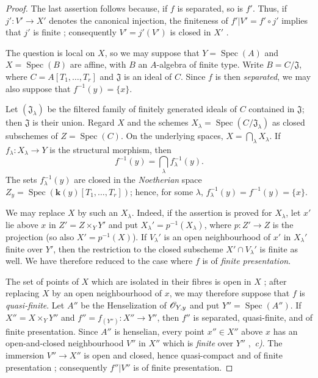 \begin{proof}
The last assertion follows because, if $f$ is separated, so is $f'$. Thus, if $j':V'\to X'$ denotes the canonical injection, the finiteness of $f'|V'=f'\circ j'$ implies that $j'$ is finite ; consequently $V'=j'(V')$ is closed in $X'$ .

The question is local on $X$, so we may suppose that $Y=\operatorname{Spec}(A)$ and $X=\operatorname{Spec}(B)$ are affine, with $B$ an $A$-algebra of finite type. Write $B=C/\mathfrak{J}$, where $C=A[T_1,\ldots,T_r]$ and $\mathfrak{J}$ is an ideal of $C$. Since $f$ is then \emph{separated}, we may also suppose that $f^{-1}(y)=\{x\}$.

Let $(\mathfrak{J}_\lambda)$ be the filtered family of finitely generated ideals of $C$ contained in $\mathfrak{J}$; then $\mathfrak{J}$ is their union. Regard $X$ and the schemes $X_\lambda=\operatorname{Spec}(C/\mathfrak{J}_\lambda)$ as closed subschemes of $Z=\operatorname{Spec}(C)$. On the underlying spaces, $X=\bigcap_\lambda X_\lambda$. If $f_\lambda:X_\lambda\to Y$ is the structural morphism, then
\[
  f^{-1}(y)=\bigcap_\lambda f_\lambda^{-1}(y).
\]
The sets $f_\lambda^{-1}(y)$ are closed in the \emph{Noetherian} space $Z_y=\operatorname{Spec}(\boldsymbol{k}(y)[T_1,\ldots,T_r])$; hence, for some $\lambda$, $f_\lambda^{-1}(y)=f^{-1}(y)=\{x\}$.

We may replace $X$ by such an $X_\lambda$. Indeed, if the assertion is proved for $X_\lambda$, let $x'$ lie above $x$ in $Z'=Z\times_{Y}Y'$ and put $X_\lambda'=p^{-1}(X_\lambda)$, where $p:Z'\to Z$ is the projection (so also $X'=p^{-1}(X)$). If $V_\lambda'$ is an open neighbourhood of $x'$ in $X_\lambda'$ finite over $Y'$, then the restriction to the closed subscheme $X'\cap V_\lambda'$ is finite as well. We have therefore reduced to the case where $f$ is of \emph{finite presentation}.

The set of points of $X$ which are isolated in their fibres is open in $X$ ; after replacing $X$ by an open neighbourhood of $x$, we may therefore suppose that $f$ is \emph{quasi-finite}. Let $A''$ be the Henselization of $\mathscr{O}_{Y,y}$ and put $Y''=\operatorname{Spec}(A'')$. If $X''=X\times_{Y}Y''$ and $f''=f_{(Y'')}:X''\to Y''$, then $f''$ is separated, quasi-finite, and of finite presentation. Since $A''$ is henselian, every point $x''\in X''$ above $x$ has an open-and-closed neighbourhood $V''$ in $X''$ which is \emph{finite} over $Y''$ ,~\emph{c)}. The immersion $V''\to X''$ is open and closed, hence quasi-compact and of finite presentation ; consequently $f''|V''$ is of finite presentation.


\end{proof}
